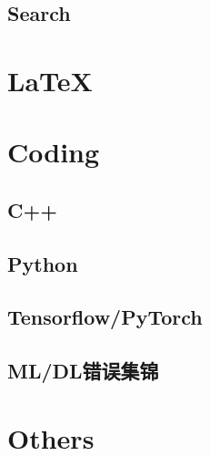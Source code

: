 \documentclass{article}
\begin{document}
\subsection{Search}



\section{\LaTeX}


\section{Coding}

\subsection{C++}


\subsection{Python}


\subsection{Tensorflow/PyTorch}


\subsection{ML/DL错误集锦}

%

\section{Others}


\end{document}
